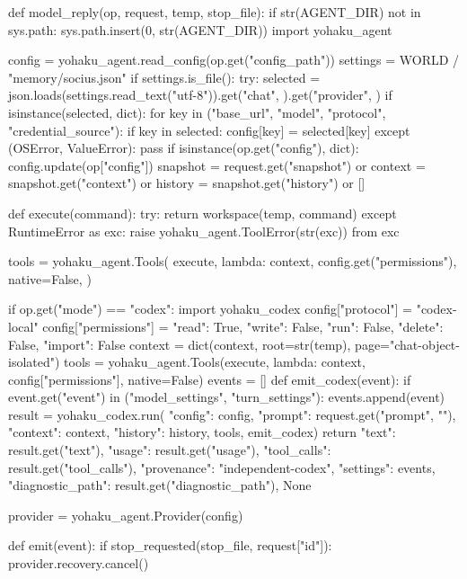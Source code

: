 def model_reply(op, request, temp, stop_file):
    if str(AGENT_DIR) not in sys.path:
        sys.path.insert(0, str(AGENT_DIR))
    import yohaku_agent

    config = yohaku_agent.read_config(op.get("config_path"))
    settings = WORLD / "memory/socius.json"
    if settings.is_file():
        try:
            selected = json.loads(settings.read_text("utf-8")).get("chat", {}).get("provider", {})
            if isinstance(selected, dict):
                for key in ("base_url", "model", "protocol", "credential_source"):
                    if key in selected:
                        config[key] = selected[key]
        except (OSError, ValueError):
            pass
    if isinstance(op.get("config"), dict):
        config.update(op["config"])
    snapshot = request.get("snapshot") or {}
    context = snapshot.get("context") or {}
    history = snapshot.get("history") or []

    def execute(command):
        try:
            return workspace(temp, command)
        except RuntimeError as exc:
            raise yohaku_agent.ToolError(str(exc)) from exc

    tools = yohaku_agent.Tools(
        execute,
        lambda: context,
        config.get("permissions"),
        native=False,
    )

    if op.get("mode") == "codex":
        import yohaku_codex
        config["protocol"] = "codex-local"
        config["permissions"] = {"read": True, "write": False, "run": False,
                                 "delete": False, "import": False}
        context = dict(context, root=str(temp), page="chat-object-isolated")
        tools = yohaku_agent.Tools(execute, lambda: context,
                                   config["permissions"], native=False)
        events = []
        def emit_codex(event):
            if event.get("event") in ("model_settings", "turn_settings"):
                events.append(event)
        result = yohaku_codex.run(
            {"config": config, "prompt": request.get("prompt", ""),
             "context": context, "history": history}, tools, emit_codex)
        return {"text": result.get("text"), "usage": result.get("usage"),
                "tool_calls": result.get("tool_calls"), "provenance": "independent-codex",
                "settings": events, "diagnostic_path": result.get("diagnostic_path")}, None

    provider = yohaku_agent.Provider(config)

    def emit(event):
        if stop_requested(stop_file, request["id"]):
            provider.recovery.cancel()

